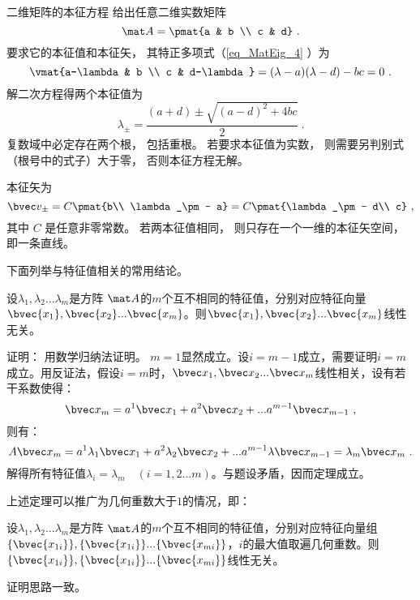 \begin{example}{二维矩阵的本征方程}
给出任意二维实数矩阵
\begin{equation}
\mat A = \pmat{a & b \\ c & d}~.
\end{equation}
要求它的本征值和本征矢， 其特正多项式（\autoref{eq_MatEig_4} ）为
\begin{equation}
\vmat{a-\lambda & b \\ c & d-\lambda} = (\lambda-a)(\lambda-d) - bc = 0~.
\end{equation}
解二次方程得两个本征值为
\begin{equation}
\lambda_\pm = \frac{(a + d) \pm \sqrt{(a-d)^2 + 4bc}}{2}~.
\end{equation}
复数域中必定存在两个根， 包括重根。 若要求本征值为实数， 则需要另判别式（根号中的式子）大于零， 否则本征方程无解。

本征矢为
\begin{equation}
\bvec v_\pm = C\pmat{b\\ \lambda_\pm - a} = C\pmat{\lambda_\pm - d\\ c}~,
\end{equation}
其中 $C$ 是任意非零常数。 若两本征值相同， 则只存在一个一维的本征矢空间， 即一条直线。
\end{example}
下面列举与特征值相关的常用结论。
\begin{theorem}{}
设$\lambda_1,\lambda_2...\lambda_m$是方阵 $\mat A$的$m$个互不相同的特征值，分别对应特征向量$\bvec {x_1},\bvec {x_2}...\bvec{x_m}$。则$\bvec {x_1},\bvec {x_2}...\bvec{x_m}$线性无关。
\end{theorem}
证明： 
用数学归纳法证明。
$m=1$显然成立。设$i=m-1$成立，需要证明$i=m$成立。用反证法，假设$i=m$时，$\bvec x_1,\bvec x_2...\bvec x_m$线性相关，设有若干系数使得：
\begin{equation}
\bvec x_m=a^1\bvec x_1+a^2\bvec x_2+...a^{m-1} \bvec x_{m-1}~,
\end{equation}
则有：
\begin{equation}
 A\bvec x_m=a^1\lambda_1\bvec x_1+a^2\lambda_2\bvec x_2+...a^{m-1}\lambda \bvec x_{m-1}=\lambda_m\bvec x_m~.
\end{equation}
解得所有特征值$\lambda_i=\lambda_m\quad (i=1,2...m)$。与题设矛盾，因而定理成立。

上述定理可以推广为几何重数大于$1$的情况，即：
\begin{corollary}{}
设$\lambda_1,\lambda_2...\lambda_m$是方阵 $\mat A$的$m$个互不相同的特征值，分别对应特征向量组$\{\bvec{x_{1i}}\},\{\bvec{x_{1i}}\}...\{\bvec {x_{mi}}\}$，$i$的最大值取遍几何重数。则$\{\bvec{x_{1i}}\},\{\bvec{x_{1i}}\}...\{\bvec {x_{mi}}\}$线性无关。
\end{corollary}
证明思路一致。

